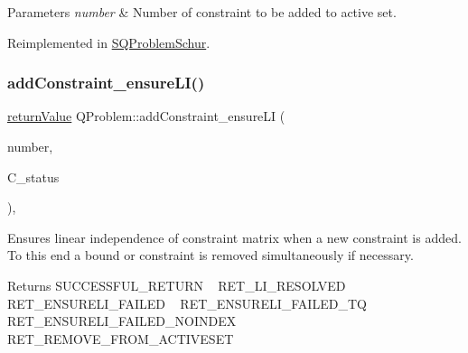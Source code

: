 \begin{DoxyParams}{Parameters}
{\em number} & Number of constraint to be added to active set. \\
\hline
\end{DoxyParams}


Reimplemented in \hyperlink{class_s_q_problem_schur_a0dd498ae9d7684d3d9fc9ed83d161c1e}{S\+Q\+Problem\+Schur}.

\mbox{\label{class_q_problem_a5761ba3214ade56f7857468e746a6469}} 
\subsubsection{\texorpdfstring{add\+Constraint\+\_\+ensure\+L\+I()}{addConstraint\_ensureLI()}}
{\footnotesize\ttfamily \hyperlink{_message_handling_8hpp_a81d556f613bfbabd0b1f9488c0fa865e}{return\+Value} Q\+Problem\+::add\+Constraint\+\_\+ensure\+LI (\begin{DoxyParamCaption}\item[{\hyperlink{_types_8hpp_ab6fd6105e64ed14a0c9281326f05e623}{int\+\_\+t}}]{number,  }\item[{\hyperlink{_types_8hpp_a70a6a40d261a015ead8d43aa589383a4}{Subject\+To\+Status}}]{C\+\_\+status }\end{DoxyParamCaption})\hspace{0.3cm}{\ttfamily [protected]}, {\ttfamily [virtual]}}

Ensures linear independence of constraint matrix when a new constraint is added. To this end a bound or constraint is removed simultaneously if necessary. \begin{DoxyReturn}{Returns}
S\+U\+C\+C\+E\+S\+S\+F\+U\+L\+\_\+\+R\+E\+T\+U\+RN ~\newline
 R\+E\+T\+\_\+\+L\+I\+\_\+\+R\+E\+S\+O\+L\+V\+ED ~\newline
 R\+E\+T\+\_\+\+E\+N\+S\+U\+R\+E\+L\+I\+\_\+\+F\+A\+I\+L\+ED ~\newline
 R\+E\+T\+\_\+\+E\+N\+S\+U\+R\+E\+L\+I\+\_\+\+F\+A\+I\+L\+E\+D\+\_\+\+TQ ~\newline
 R\+E\+T\+\_\+\+E\+N\+S\+U\+R\+E\+L\+I\+\_\+\+F\+A\+I\+L\+E\+D\+\_\+\+N\+O\+I\+N\+D\+EX ~\newline
 R\+E\+T\+\_\+\+R\+E\+M\+O\+V\+E\+\_\+\+F\+R\+O\+M\+\_\+\+A\+C\+T\+I\+V\+E\+S\+ET 
\end{DoxyReturn}

